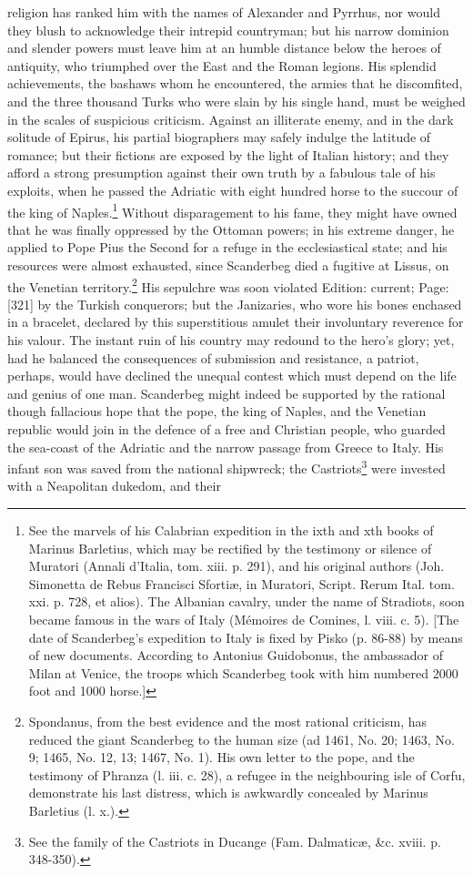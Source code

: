 religion has ranked him with the names of Alexander and Pyrrhus, nor would they blush to acknowledge their intrepid countryman; but his narrow dominion and slender powers must leave him at an humble distance below the heroes of antiquity, who triumphed over the East and the Roman legions. His splendid achievements, the bashaws whom he encountered, the armies that he discomfited, and the three thousand Turks who were slain by his single hand, must be weighed in the scales of suspicious criticism. Against an illiterate enemy, and in the dark solitude of Epirus, his partial biographers may safely indulge the latitude of romance; but their fictions are exposed by the light of Italian history; and they afford a strong presumption against their own truth by a fabulous tale of his exploits, when he passed the Adriatic with eight hundred horse to the succour of the king of Naples.\footnote{See the marvels of his Calabrian expedition in the ixth and xth books of Marinus Barletius, which may be rectified by the testimony or silence of Muratori (Annali d\texthebrew{}’Italia, tom. xiii. p. 291), and his original authors (Joh. Simonetta de Rebus Francisci Sfortiæ, in Muratori, Script. Rerum Ital. tom. xxi. p. 728, et alios). The Albanian cavalry, under the name of Stradiots, soon became famous in the wars of Italy (Mémoires de Comines, l. viii. c. 5). [The date of Scanderbeg\texthebrew{}’s expedition to Italy is fixed by Pisko (p. 86-88) by means of new documents. According to Antonius Guidobonus, the ambassador of Milan at Venice, the troops which Scanderbeg took with him numbered 2000 foot and 1000 horse.]} Without disparagement to his fame, they might have owned that he was finally oppressed by the Ottoman powers; in his extreme danger, he applied to Pope Pius the Second for a refuge in the ecclesiastical state; and his resources were almost exhausted, since Scanderbeg died a fugitive at Lissus, on the Venetian territory.\footnote{Spondanus, from the best evidence and the most rational criticism, has reduced the giant Scanderbeg to the human size (ad 1461, No. 20; 1463, No. 9; 1465, No. 12, 13; 1467, No. 1). His own letter to the pope, and the testimony of Phranza (l. iii. c. 28), a refugee in the neighbouring isle of Corfu, demonstrate his last distress, which is awkwardly concealed by Marinus Barletius (l. x.).} His sepulchre was soon violated Edition: current; Page: [321] by the Turkish conquerors; but the Janizaries, who wore his bones enchased in a bracelet, declared by this superstitious amulet their involuntary reverence for his valour. The instant ruin of his country may redound to the hero\texthebrew{}’s glory; yet, had he balanced the consequences of submission and resistance, a patriot, perhaps, would have declined the unequal contest which must depend on the life and genius of one man. Scanderbeg might indeed be supported by the rational though fallacious hope that the pope, the king of Naples, and the Venetian republic would join in the defence of a free and Christian people, who guarded the sea-coast of the Adriatic and the narrow passage from Greece to Italy. His infant son was saved from the national shipwreck; the Castriots\footnote{See the family of the Castriots in Ducange (Fam. Dalmaticæ, \&c. xviii. p. 348-350).} were invested with a Neapolitan dukedom, and their 